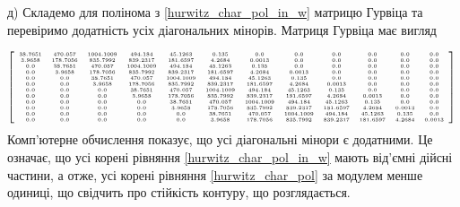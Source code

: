 д)\; Складемо для полінома з \eqref{hurwitz_char_pol_in_w} матрицю Гурвіца та перевіримо додатність усіх діагональних мінорів. Матриця Гурвіца має вигляд

\begin{gather*}
    \mbox{\tiny
    $
    \left[\begin{array}{cccccccccccc}
        38.7651 & 470.057 & 1004.1009 & 494.184 & 45.1263 & 0.135 & 0.0 & 0.0 & 0.0 & 0.0 & 0.0 & 0.0 \\
        3.9658 & 178.7056 & 835.7992 & 839.2317 & 181.6597 & 4.2684 & 0.0013 & 0.0 & 0.0 & 0.0 & 0.0 & 0.0 
        \\0.0 & 38.7651 & 470.057 & 1004.1009 & 494.184 & 45.1263 & 0.135 & 0.0 & 0.0 & 0.0 & 0.0 & 0.0 
        \\0.0 & 3.9658 & 178.7056 & 835.7992 & 839.2317 & 181.6597 & 4.2684 & 0.0013 & 0.0 & 0.0 & 0.0 & 0.0 
        \\0.0 & 0.0 & 38.7651 & 470.057 & 1004.1009 & 494.184 & 45.1263 & 0.135 & 0.0 & 0.0 & 0.0 & 0.0 
        \\0.0 & 0.0 & 3.9658 & 178.7056 & 835.7992 & 839.2317 & 181.6597 & 4.2684 & 0.0013 & 0.0 & 0.0 & 0.0 
        \\0.0 & 0.0 & 0.0 & 38.7651 & 470.057 & 1004.1009 & 494.184 & 45.1263 & 0.135 & 0.0 & 0.0 & 0.0 
        \\0.0 & 0.0 & 0.0 & 3.9658 & 178.7056 & 835.7992 & 839.2317 & 181.6597 & 4.2684 & 0.0013 & 0.0 & 0.0 
        \\0.0 & 0.0 & 0.0 & 0.0 & 38.7651 & 470.057 & 1004.1009 & 494.184 & 45.1263 & 0.135 & 0.0 & 0.0 
        \\0.0 & 0.0 & 0.0 & 0.0 & 3.9658 & 178.7056 & 835.7992 & 839.2317 & 181.6597 & 4.2684 & 0.0013 & 0.0 
        \\0.0 & 0.0 & 0.0 & 0.0 & 0.0 & 38.7651 & 470.057 & 1004.1009 & 494.184 & 45.1263 & 0.135 & 0.0 
        \\0.0 & 0.0 & 0.0 & 0.0 & 0.0 & 3.9658 & 178.7056 & 835.7992 & 839.2317 & 181.6597 & 4.2684 & 0.0013
    \end{array}\right]
    $
    }
\end{gather*}
Комп'ютерне обчислення показує, що усі діагональні мінори є додатними. Це означає, що усі корені рівняння \eqref{hurwitz_char_pol_in_w}
мають від'ємні дійсні частини, а отже, усі корені рівняння \eqref{hurwitz_char_pol} за модулем менше одиниці, що свідчить про стійкість
контуру, що розглядається.

